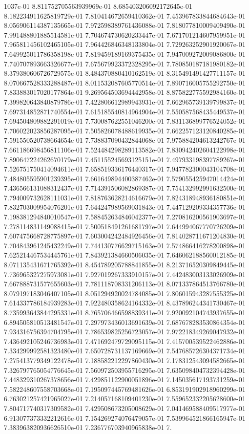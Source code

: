 1037e-01	8.811752705563939969e-01	8.685403206092172645e-01	8.182234911625819729e-01	7.810414672659410362e-01	7.453967833844684643e-01	8.056906114387135665e-01	7.972598389761436088e-01	7.818077810009409490e-01	7.991488801885514581e-01	7.704674730620233447e-01	7.671701214607959951e-01	7.965811456102465105e-01	7.964426846348133804e-01	7.729263252901920067e-01	7.649925011786358198e-01	7.819459189169375435e-01	7.947009272009086800e-01	7.740707893663326677e-01	7.675679923372328295e-01	7.780850187181980182e-01	8.379380606726729575e-01	8.484370880410162519e-01	8.315491491427711157e-01	8.070667528333288487e-01	8.011532087605770514e-01	7.890716005755292750e-01	7.833883017020177864e-01	9.269564503694442958e-01	8.875822775592984160e-01	7.399820643840879786e-01	7.422806612989943931e-01	7.662965739139799837e-01	7.697314852871740554e-01	7.615185540814964904e-01	7.550587568435449537e-01	7.694504809882291019e-01	7.730087622551046200e-01	7.831136899776524052e-01	7.706022023856287095e-01	7.505826078488619935e-01	7.662257123120840285e-01	7.591550520738664654e-01	7.738837090432844068e-01	7.975884204613242767e-01	7.661186698456811106e-01	7.524484298289113582e-01	7.830942402604122998e-01	7.890647224262670179e-01	7.451155245693125151e-01	7.497933198397789267e-01	7.526751750414094611e-01	7.658519336176440317e-01	7.947782300043104708e-01	7.484805595901239395e-01	7.661649894400387462e-01	7.579055425947014424e-01	7.436566131088312437e-01	7.714391506082869387e-01	7.754132992991632500e-01	7.794009732628111031e-01	7.818763628214616679e-01	7.824318948936180851e-01	7.832703009954076201e-01	7.644247989569031843e-01	7.447129209334357736e-01	7.198381294840010547e-01	7.588452634846042377e-01	7.270816200561903697e-01	7.278114831149088415e-01	7.500518491261681797e-01	7.644994067770726209e-01	7.607475668728775897e-01	7.603004242484926456e-01	7.814028711671204830e-01	7.704843961245432249e-01	7.744130776629715163e-01	7.574866416278200898e-01	7.625214467534445761e-01	7.843921384660506035e-01	7.646062188560012185e-01	8.071135431671765392e-01	8.454789205788841855e-01	8.213716520309849445e-01	7.736965327275973081e-01	7.927019267333910157e-01	7.442483003133026909e-01	7.667888731577655603e-01	7.781118708331206113e-01	8.071337864513766780e-01	8.079197183046407105e-01	8.051294920024784085e-01	7.806015943287555325e-01	7.614337786184939283e-01	7.922480358624164332e-01	8.437896244341730467e-01	8.735993643844295331e-01	8.765706466598839341e-01	7.920092104743937655e-01	6.894505810513481547e-01	7.297973436013691639e-01	7.687678283530864354e-01	7.934316756394704795e-01	7.786539825256723057e-01	7.972218349269047932e-01	7.436492105246736983e-01	7.471692479729095115e-01	7.415700539522462886e-01	7.334299992581323480e-01	7.650728731137169669e-01	7.547685726304371734e-01	7.275413779349122478e-01	7.188582212297860430e-01	7.178312543094582665e-01	7.326797765054776645e-01	7.560972503955716295e-01	7.635098404732394428e-01	7.448329310267378656e-01	7.429851122900051896e-01	7.145035617193731259e-01	7.582248607558703668e-01	7.195097445769481626e-01	6.853191902918960299e-01	6.763021257421965027e-01	7.214057168109401230e-01	7.559652332205628600e-01	7.804717740317309582e-01	7.429508673205008629e-01	7.041469588409517977e-01	6.913077373332212616e-01	7.154269274076479057e-01	7.539964521866165947e-01	7.383963820936626510e-01	7.236776703940965838e-01	7.